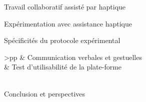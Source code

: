 \documentclass[myfrancais]{mythesis}
\begin{document}
\begin{mychapter}{Travail collaboratif assisté par haptique}
\begin{mysection}{Expérimentation avec assistance haptique}
\begin{mysubsection}{Spécificités du protocole expérimental}
\begin{mytable}
\begin{mytabular}{>{\bfseries}p{\expfourfirstcolumn}p{\expfoursecondcolumn}}
						                                          &  Communication verbales et gestuelles                           \\
						                                          &  Test d'utilisabilité de la plate-forme                         \\
						\mymiddlerule[\heavyrulewidth]
						 \\
						\mybottomrule
					\end{mytabular}
				\end{mytable}
			\end{mysubsection}
		\end{mysection}
	\end{mychapter}
	\begin{mychapter+}{Conclusion et perspectives}
	\end{mychapter+}
\end{document}

